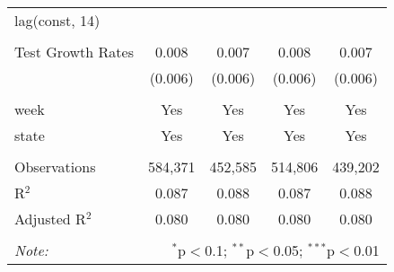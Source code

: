 \begin{tabular}{@{\extracolsep{1pt}}lcccc}
  lag(const, 14) &  &  &  &  \\ 
  &  &  &  &  \\ 
  Test Growth Rates & 0.008 & 0.007 & 0.008 & 0.007 \\ 
  & (0.006) & (0.006) & (0.006) & (0.006) \\ 
 \hline \\[-1.8ex] 
week & Yes & Yes & Yes & Yes \\ 
state & Yes & Yes & Yes & Yes \\ 
\hline \\[-1.8ex] 
Observations & 584,371 & 452,585 & 514,806 & 439,202 \\ 
R$^{2}$ & 0.087 & 0.088 & 0.087 & 0.088 \\ 
Adjusted R$^{2}$ & 0.080 & 0.080 & 0.080 & 0.080 \\ 
\hline 
\hline \\[-1.8ex] 
\textit{Note:}  & \multicolumn{4}{r}{$^{*}$p$<$0.1; $^{**}$p$<$0.05; $^{***}$p$<$0.01} \\ 
\end{tabular} 